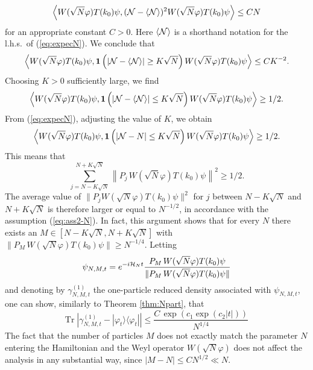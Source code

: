 \documentclass[11pt,a4paper]{article}
\newcommand{\tr}{\mbox{Tr}}
\newcommand{\cH}{{\cal H}}
\newcommand{\cN}{{\cal N}}
\begin{document}
\begin{itemize}
 \[ \left\langle W(\sqrt{N} \varphi) T(k_0) \psi, (\cN - \langle \cN \rangle)^2 W(\sqrt{N} \varphi) T(k_0) \psi \right\rangle \leq C N \]
for an appropriate constant $C >0$. Here $\langle \cN \rangle$ is a shorthand notation for the l.h.s.\ of (\ref{eq:expecN}). We conclude that
\[  \left\langle W(\sqrt{N} \varphi) T(k_0) \psi,  {\bf 1} \left(| \cN -
\langle \cN \rangle | \geq K \sqrt{N} \right)  W(\sqrt{N} \varphi) T(k_0)
\psi \right\rangle \leq C K^{-2}. \]
Choosing $K >0$ sufficiently large, we find
\[ \left\langle W(\sqrt{N} \varphi) T(k_0) \psi,  {\bf 1} \left(| \cN -
\langle \cN \rangle | \leq K \sqrt{N} \right)  W(\sqrt{N} \varphi) T(k_0)
\psi \right\rangle \geq 1/2. \] 
{F}rom (\ref{eq:expecN}), adjusting the value of $K$, we obtain
\[ \left\langle W(\sqrt{N} \varphi) T(k_0) \psi,  {\bf 1} \left(| \cN - N |
\leq K \sqrt{N} \right)  W(\sqrt{N} \varphi) T(k_0) \psi \right\rangle \geq
1/2. \] 
This means that
\[ \sum_{j= N - K \sqrt{N}}^{N+K \sqrt{N}} \left\| P_j \,  W(\sqrt{N} \varphi) T(k_0) \psi \right\|^2 \geq 1/2. \]
The average value of $\| P_j W (\sqrt{N} \varphi) T(k_0) \psi \|^2$ for $j$ between $N- K \sqrt{N}$ and $N+K \sqrt{N}$ is therefore larger or equal to $N^{-1/2}$, in accordance with the assumption (\ref{eq:ass2-N}). In fact, this argument shows that for every $N$ there exists an $M \in [N-K \sqrt{N} , N + K \sqrt{N}]$ with $\| P_M \, W(\sqrt{N} \varphi) T(k_0) \psi \| \geq N^{-1/4}$. Letting \[ \psi_{N,M,t} = e^{-i \cH_N t}  \frac{P_M \, W(\sqrt{N} \varphi) T(k_0) \psi}{\|  P_M \, W(\sqrt{N} \varphi) T(k_0) \psi \|} \]
and denoting by $\gamma^{(1)}_{N,M,t}$ the one-particle reduced density associated with $\psi_{N,M,t}$, one can show, similarly to Theorem \ref{thm:Npart}, that
\[ \tr \; \left| \gamma^{(1)}_{N,M,t} - |\varphi_t \rangle \langle \varphi_t| \right| \leq  \frac{C\,  \exp \left( c_1 \exp (c_2 |t|) \right)}{N^{1/4}} \]
The fact that the number of particles $M$ does not exactly match the parameter $N$ entering the Hamiltonian and the Weyl operator $W(\sqrt{N} \varphi)$ does not affect the analysis in any substantial way, since $|M - N| \leq C N^{1/2} \ll N$. 
\end{itemize}
\end{document}
